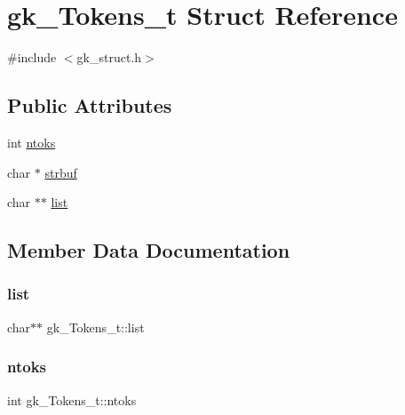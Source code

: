 \hypertarget{structgk___tokens__t}{}\section{gk\+\_\+\+Tokens\+\_\+t Struct Reference}
\label{structgk___tokens__t}


{\ttfamily \#include $<$gk\+\_\+struct.\+h$>$}

\subsection*{Public Attributes}
\begin{DoxyCompactItemize}
\item 
int \hyperlink{structgk___tokens__t_a9a6e215f177a16bc5852abd3953fa12e}{ntoks}
\item 
char $\ast$ \hyperlink{structgk___tokens__t_a2770337d903acb342ec9540882b53601}{strbuf}
\item 
char $\ast$$\ast$ \hyperlink{structgk___tokens__t_a3e5376a3057dc7102615daa0dcbd44f8}{list}
\end{DoxyCompactItemize}


\subsection{Member Data Documentation}
\mbox{\label{structgk___tokens__t_a3e5376a3057dc7102615daa0dcbd44f8}} 
\subsubsection{\texorpdfstring{list}{list}}
{\footnotesize\ttfamily char$\ast$$\ast$ gk\+\_\+\+Tokens\+\_\+t\+::list}

\mbox{\label{structgk___tokens__t_a9a6e215f177a16bc5852abd3953fa12e}} 
\subsubsection{\texorpdfstring{ntoks}{ntoks}}
{\footnotesize\ttfamily int gk\+\_\+\+Tokens\+\_\+t\+::ntoks}

